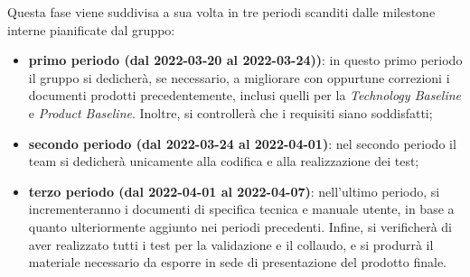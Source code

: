 Questa fase viene suddivisa a sua volta in tre periodi scanditi dalle milestone interne pianificate dal gruppo:
\begin{itemize}
	\item \textbf{primo periodo (dal 2022-03-20 al 2022-03-24))}: in questo primo periodo il gruppo si dedicherà,  se necessario,  a migliorare con oppurtune correzioni i documenti prodotti precedentemente,  inclusi quelli per la \textit{Technology Baseline} e \textit{Product Baseline}.  Inoltre,  si controllerà che i requisiti siano soddisfatti;
	\item \textbf{secondo periodo (dal 2022-03-24 al 2022-04-01)}: nel secondo periodo il team si dedicherà unicamente alla codifica e alla realizzazione dei test;
	\item \textbf{terzo periodo (dal 2022-04-01 al 2022-04-07)}: nell'ultimo periodo,  si incrementeranno i documenti di specifica tecnica e manuale utente,  in base a quanto ulteriormente aggiunto nei periodi precedenti.  Infine,  si verificherà di aver realizzato tutti i test per la validazione e il collaudo,  e si produrrà il materiale necessario da esporre in sede di presentazione del prodotto finale.
\end{itemize}